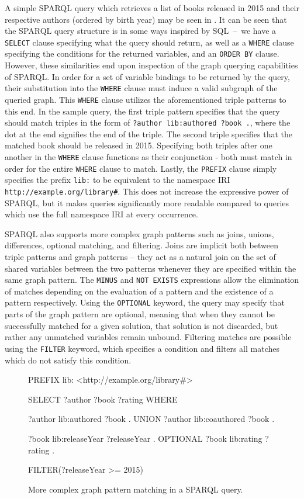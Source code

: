 A simple SPARQL query which retrieves a list of books released in 2015 and their respective authors (ordered by birth year) may be seen in .
It can be seen that the SPARQL query structure is in some ways inspired by SQL~--~we have a \texttt{SELECT} clause specifying what the query should return, as well as a \texttt{WHERE} clause specifying the conditions for the returned variables, and an \texttt{ORDER BY} clause.
However, these similarities end upon inspection of the graph querying capabilities of SPARQL.
In order for a set of variable bindings to be returned by the query, their substitution into the \texttt{WHERE} clause must induce a valid subgraph of the queried graph.
This \texttt{WHERE} clause utilizes the aforementioned triple patterns to this end.
In the sample query, the first triple pattern specifies that the query should match triples in the form of \texttt{?author lib:authored ?book .}, where the dot at the end signifies the end of the triple.
The second triple specifies that the matched book should be released in 2015.
Specifying both triples after one another in the \texttt{WHERE} clause functions as their conjunction - both must match in order for the entire \texttt{WHERE} clause to match.
Lastly, the \texttt{PREFIX} clause simply specifies the prefix \texttt{lib:} to be equivalent to the namespace IRI \texttt{http://example.org/library\#}.
This does not increase the expressive power of SPARQL, but it makes queries significantly more readable compared to queries which use the full namespace IRI at every occurrence.

SPARQL also supports more complex graph patterns such as joins, unions, differences, optional matching, and filtering.
Joins are implicit both between triple patterns and graph patterns -- they act as a natural join on the set of shared variables between the two patterns whenever they are specified within the same graph pattern.
The \texttt{MINUS} and \texttt{NOT EXISTS} expressions allow the elimination of matches depending on the evaluation of a pattern and the existence of a pattern respectively.
Using the \texttt{OPTIONAL} keyword, the query may specify that parts of the graph pattern are optional, meaning that when they cannot be successfully matched for a given solution, that solution is not discarded, but rather any unmatched variables remain unbound.
Filtering matches are possible using the \texttt{FILTER} keyword, which specifies a condition and filters all matches which do not satisfy this condition.

\begin{figure}[ht]
\begin{code}[]
PREFIX lib: <http://example.org/library#>

SELECT ?author ?book ?rating
WHERE
{
    { ?author lib:authored ?book . }
    UNION
    { ?author lib:coauthored ?book .}
    
    ?book   lib:releaseYear ?releaseYear .
    OPTIONAL { ?book lib:rating ?rating . }
    
    FILTER(?releaseYear >= 2015)
}
\end{code}
\caption{More complex graph pattern matching in a SPARQL query.}
\label{fig:sparqlpattern}
\end{figure}

